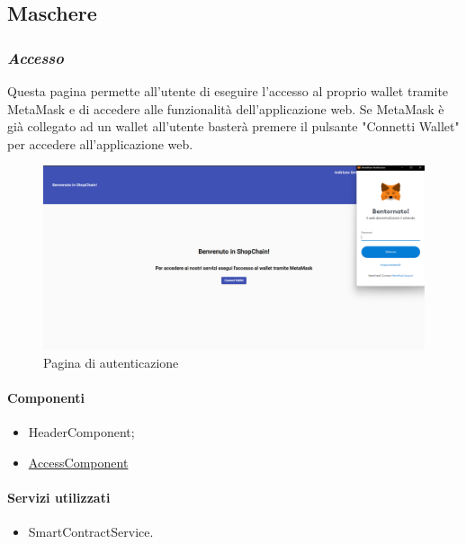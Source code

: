 \subsection{Maschere}

\subsubsection*{\textit{Accesso}}
Questa pagina permette all'utente di eseguire l'accesso al proprio wallet tramite MetaMask e di accedere alle funzionalità dell'applicazione web. Se MetaMask è già collegato ad un wallet all'utente basterà premere il pulsante "Connetti Wallet" per accedere all'applicazione web.

\begin{figure}[!h] 
    \centering 
    \includegraphics[width=1\columnwidth]{immagini/maschere/autenticazione.png} 
    \caption{Pagina di autenticazione}
\end{figure}

\paragraph{Componenti}
\begin{itemize}
    \item HeaderComponent;
    \item \hyperref[sec:access-component]{AccessComponent}
\end{itemize}

\paragraph{Servizi utilizzati}
\begin{itemize}
    \item SmartContractService.
\end{itemize}

\newpage

